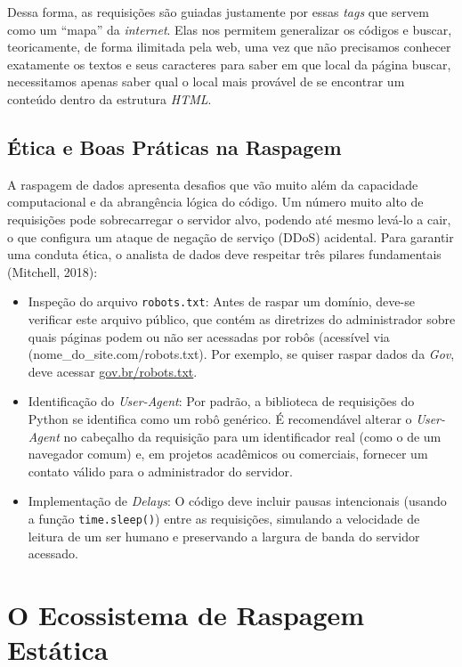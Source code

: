 \documentclass[
  brazilian,
  letterpaper,
  DIV=11,
  numbers=noendperiod]{scrreprt}
\begin{document}
Dessa forma, as requisições são guiadas justamente por essas \emph{tags}
que servem como um ``mapa'' da \emph{internet}. Elas nos permitem
generalizar os códigos e buscar, teoricamente, de forma ilimitada pela
web, uma vez que não precisamos conhecer exatamente os textos e seus
caracteres para saber em que local da página buscar, necessitamos apenas
saber qual o local mais provável de se encontrar um conteúdo dentro da
estrutura \emph{HTML}.

\subsection{Ética e Boas Práticas na
Raspagem}\label{uxe9tica-e-boas-pruxe1ticas-na-raspagem}

A raspagem de dados apresenta desafios que vão muito além da capacidade
computacional e da abrangência lógica do código. Um número muito alto de
requisições pode sobrecarregar o servidor alvo, podendo até mesmo
levá-lo a cair, o que configura um ataque de negação de serviço (DDoS)
acidental. Para garantir uma conduta ética, o analista de dados deve
respeitar três pilares fundamentais (Mitchell, 2018):

\begin{itemize}
\item
  Inspeção do arquivo \texttt{robots.txt}: Antes de raspar um domínio,
  deve-se verificar este arquivo público, que contém as diretrizes do
  administrador sobre quais páginas podem ou não ser acessadas por robôs
  (acessível via (nome\_do\_site.com/robots.txt). Por exemplo, se quiser
  raspar dados da \emph{Gov}, deve acessar
  \href{https://www.gov.br/robots.txt}{gov.br/robots.txt}.
\item
  Identificação do \emph{User-Agent}: Por padrão, a biblioteca de
  requisições do Python se identifica como um robô genérico. É
  recomendável alterar o \emph{User-Agent} no cabeçalho da requisição
  para um identificador real (como o de um navegador comum) e, em
  projetos acadêmicos ou comerciais, fornecer um contato válido para o
  administrador do servidor.
\item
  Implementação de \emph{Delays}: O código deve incluir pausas
  intencionais (usando a função \texttt{time.sleep()}) entre as
  requisições, simulando a velocidade de leitura de um ser humano e
  preservando a largura de banda do servidor acessado.
\end{itemize}

\section{O Ecossistema de Raspagem
Estática}\label{o-ecossistema-de-raspagem-estuxe1tica}
\end{document}
